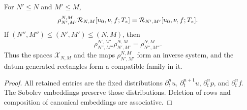 \begin{proposition}
\label{prop:rectangle-compatibility}
For \(N'\le N\) and \(M'\le M\),
\begin{equation}
 \rho_{N',M'}^{N,M}\mathcal R_{N,M}[u_0,\nu,f;T_*]
 =\mathcal R_{N',M'}[u_0,\nu,f;T_*].
 \label{eq:rectangle-compatibility}
\end{equation}
If
\((N'',M'')\le(N',M')\le(N,M)\), then
\[
 \rho_{N'',M''}^{N',M'}\rho_{N',M'}^{N,M}
 =\rho_{N'',M''}^{N,M}.
\]
Thus the spaces \(\mathscr X_{N,M}\) and the maps
\(\rho_{N',M'}^{N,M}\) form an inverse system, and the datum-generated
rectangles form a compatible family in it.
\end{proposition}

\begin{proof}
All retained entries are the fixed distributions
\(\partial_t^nu\), \(\partial_t^{n+1}u\), \(\partial_t^np\), and
\(\partial_t^nf\).
The Sobolev embeddings preserve those distributions.  Deletion of rows and
composition of canonical embeddings are associative.
\end{proof}
